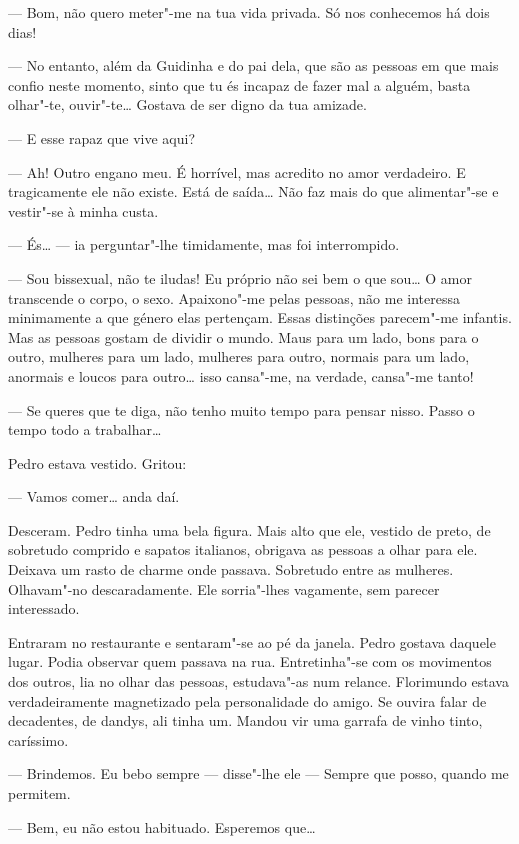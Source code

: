 --- Bom, não quero meter"-me na tua vida privada. Só nos conhecemos há dois
dias!

--- No entanto, além da Guidinha e do pai dela, que são as pessoas em que
mais confio neste momento, sinto que tu és incapaz de fazer mal a
alguém, basta olhar"-te, ouvir"-te\ldots{} Gostava de ser digno da tua amizade.

--- E esse rapaz que vive aqui?

--- Ah! Outro engano meu. É horrível, mas acredito no amor verdadeiro. E
tragicamente ele não existe. Está de saída\ldots{} Não faz mais do que
alimentar"-se e vestir"-se à minha custa.

--- És\ldots{} --- ia perguntar"-lhe timidamente, mas foi interrompido.

--- Sou bissexual, não te iludas! Eu próprio não sei bem o que
sou\ldots{} O amor transcende o corpo, o sexo. Apaixono"-me pelas pessoas,
não me interessa minimamente a que género elas pertençam. Essas
distinções parecem"-me infantis. Mas as pessoas gostam de dividir o
mundo. Maus para um lado, bons para o outro, mulheres para um lado,
mulheres para outro, normais para um lado, anormais e loucos para
outro\ldots{} isso cansa"-me, na verdade, cansa"-me tanto!

--- Se queres que te diga, não tenho muito tempo para pensar nisso. Passo
o tempo todo a trabalhar\ldots{}

Pedro estava vestido. Gritou:

--- Vamos comer\ldots{} anda daí.

Desceram. Pedro tinha uma bela figura. Mais alto que ele, vestido de
preto, de sobretudo comprido e sapatos italianos, obrigava as pessoas a
olhar para ele. Deixava um rasto de charme onde passava. Sobretudo entre
as mulheres. Olhavam"-no descaradamente. Ele sorria"-lhes vagamente, sem
parecer interessado.

Entraram no restaurante e sentaram"-se ao pé da janela. Pedro gostava
daquele lugar. Podia observar quem passava na rua. Entretinha"-se com os
movimentos dos outros, lia no olhar das pessoas, estudava"-as num
relance. Florimundo estava verdadeiramente magnetizado pela
personalidade do amigo. Se ouvira falar de decadentes, de dandys, ali
tinha um. Mandou vir uma garrafa de vinho tinto, caríssimo.

--- Brindemos. Eu bebo sempre --- disse"-lhe ele --- Sempre que posso, quando me
permitem.

--- Bem, eu não estou habituado. Esperemos que\ldots{}

